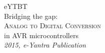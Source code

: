 \begin{titlepage}
\raggedright
{\Large eYTBT\\[1cm]}
{\large Bridging the gap:\\}
{\Huge\scshape Analog to Digital Conversion \\[.1in]}
{\large in AVR microcontrollers\\}
\vfill
{\itshape 2015, e-Yantra Publication}
\end{titlepage}